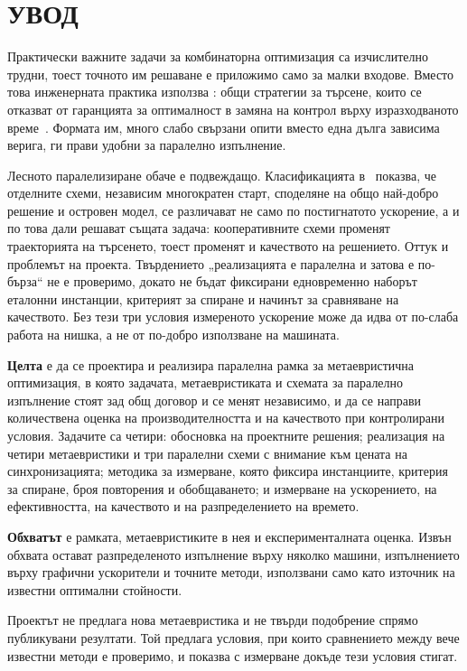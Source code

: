 \section*{УВОД}
\label{sec:introduction}

Практически важните задачи за комбинаторна оптимизация са изчислително трудни, тоест
точното им решаване е приложимо само за малки входове. Вместо това инженерната практика
използва : общи стратегии за търсене, които се отказват от гаранцията
за оптималност в замяна на контрол върху изразходваното време~\cite{blum2003metaheuristics}.
Формата им, много слабо свързани опити вместо една дълга зависима верига, ги прави удобни
за паралелно изпълнение.

Лесното паралелизиране обаче е подвеждащо. Класификацията
в~\cite{crainic2010parallel} показва, че отделните схеми, независим многократен старт,
споделяне на общо най-добро решение и островен модел, се различават не само по
постигнатото ускорение, а и по това дали решават същата задача: кооперативните схеми
променят траекторията на търсенето, тоест променят и качеството на решението. Оттук и
проблемът на проекта. Твърдението „реализацията е паралелна и затова е по-бърза“ не е
проверимо, докато не бъдат фиксирани едновременно наборът еталонни инстанции, критерият
за спиране и начинът за сравняване на качеството. Без тези три условия измереното
ускорение може да идва от по-слаба работа на нишка, а не от по-добро използване на
машината.

\textbf{Целта} е да се проектира и реализира паралелна рамка за метаевристична
оптимизация, в която задачата, метаевристиката и схемата за паралелно изпълнение стоят
зад общ договор и се менят независимо, и да се направи количествена оценка на
производителността и на качеството при контролирани условия. Задачите са четири:
обосновка на проектните решения; реализация на четири метаевристики и три паралелни
схеми с внимание към цената на синхронизацията; методика за измерване, която фиксира
инстанциите, критерия за спиране, броя повторения и обобщаването; и измерване на
ускорението, на ефективността, на качеството и на разпределението на времето.

\textbf{Обхватът} е рамката, метаевристиките в нея и експерименталната оценка. Извън
обхвата остават разпределеното изпълнение върху няколко машини, изпълнението върху
графични ускорители и точните методи, използвани само като източник на известни
оптимални стойности.

Проектът не предлага нова метаевристика и не твърди подобрение спрямо публикувани
резултати. Той предлага условия, при които сравнението между вече известни методи е
проверимо, и показва с измерване докъде тези условия стигат.

